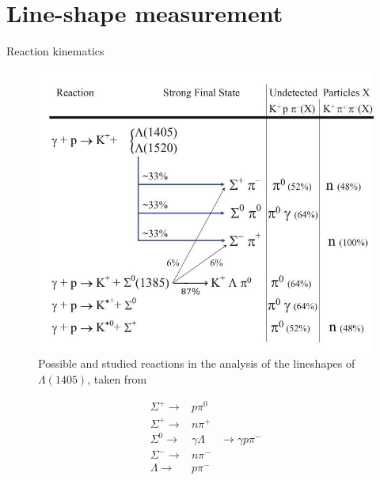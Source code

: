 \documentclass[11pt,aspectratio=1610,dvipsnames]{beamer}
\begin{document}
\section{Line-shape measurement}


\begin{frame}{Reaction kinematics}
	\begin{minipage}{.63\linewidth}
		\begin{figure}[H]
			\includegraphics[width=\linewidth]{kinematics}
			\caption{Possible and studied reactions in the analysis of the lineshapes of $\Lambda(1405)$, taken from \citet{lineshapes}}
		\end{figure}	
	\end{minipage}
	\begin{minipage}{.34\linewidth}
		\begin{align*}
			\Sigma^+\to &p \pi^0\\
			\Sigma^+\to &n \pi^+\\
			\Sigma^0\to &\gamma\Lambda&\to\gamma p \pi^-\\
			\Sigma^-\to &n \pi^-\\
			\Lambda\to &p \pi^-\\
		\end{align*}
	\end{minipage}
	
\end{frame}
\end{document}
